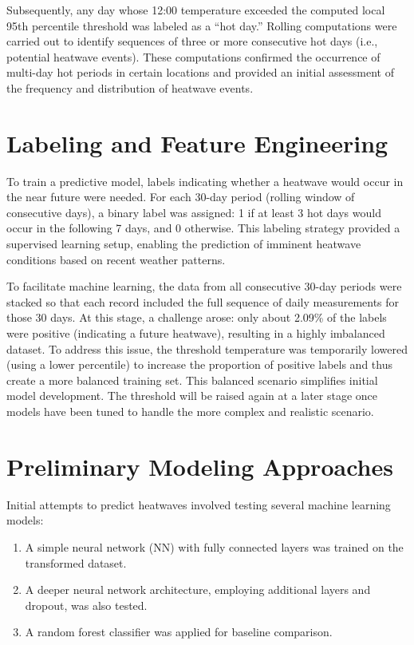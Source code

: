 \documentclass[12pt,a4paper]{article}
\begin{document}
Subsequently, any day whose 12:00 temperature exceeded the computed local 95th percentile threshold was labeled as a ``hot day.'' Rolling computations were carried out to identify sequences of three or more consecutive hot days (i.e., potential heatwave events). These computations confirmed the occurrence of multi-day hot periods in certain locations and provided an initial assessment of the frequency and distribution of heatwave events.

\section{Labeling and Feature Engineering}
To train a predictive model, labels indicating whether a heatwave would occur in the near future were needed. For each 30-day period (rolling window of consecutive days), a binary label was assigned: 1 if at least 3 hot days would occur in the following 7 days, and 0 otherwise. This labeling strategy provided a supervised learning setup, enabling the prediction of imminent heatwave conditions based on recent weather patterns.

To facilitate machine learning, the data from all consecutive 30-day periods were stacked so that each record included the full sequence of daily measurements for those 30 days. At this stage, a challenge arose: only about 2.09\% of the labels were positive (indicating a future heatwave), resulting in a highly imbalanced dataset. To address this issue, the threshold temperature was temporarily lowered (using a lower percentile) to increase the proportion of positive labels and thus create a more balanced training set. This balanced scenario simplifies initial model development. The threshold will be raised again at a later stage once models have been tuned to handle the more complex and realistic scenario.

\section{Preliminary Modeling Approaches}
Initial attempts to predict heatwaves involved testing several machine learning models:
\begin{enumerate}[1.]
    \item A simple neural network (NN) with fully connected layers was trained on the transformed dataset.
    \item A deeper neural network architecture, employing additional layers and dropout, was also tested.
    \item A random forest classifier was applied for baseline comparison.
\end{enumerate}
\end{document}
